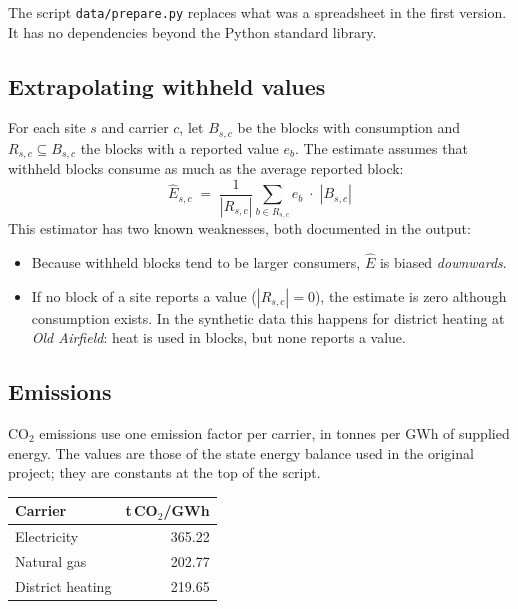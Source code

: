 \documentclass[11pt,a4paper]{article}
\begin{document}
The script \texttt{data/prepare.py} replaces what was a spreadsheet in the
first version. It has no dependencies beyond the Python standard library.

\subsection{Extrapolating withheld values}

For each site $s$ and carrier $c$, let $B_{s,c}$ be the blocks with
consumption and $R_{s,c}\subseteq B_{s,c}$ the blocks with a reported value
$e_b$. The estimate assumes that withheld blocks consume as much as the
average reported block:
\begin{equation}
  \hat E_{s,c} \;=\; \frac{1}{|R_{s,c}|}\sum_{b\in R_{s,c}} e_b \;\cdot\; |B_{s,c}|
\end{equation}
This estimator has two known weaknesses, both documented in the output:
\begin{itemize}
  \item Because withheld blocks tend to be larger consumers, $\hat E$ is
        biased \emph{downwards}.
  \item If no block of a site reports a value ($|R_{s,c}|=0$), the estimate is
        zero although consumption exists. In the synthetic data this happens
        for district heating at \emph{Old Airfield}: heat is used in
        blocks, but none reports a value.
\end{itemize}

\subsection{Emissions}

CO$_2$ emissions use one emission factor per carrier, in tonnes per GWh of
supplied energy. The values are those of the state energy balance used in the
original project; they are constants at the top of the script.

\begin{center}\small
\begin{tabular}{@{}lr@{}}
\toprule
Carrier & t\,CO$_2$/GWh \\
\midrule
Electricity & 365.22 \\
Natural gas & 202.77 \\
District heating & 219.65 \\
\bottomrule
\end{tabular}
\end{center}
\end{document}
